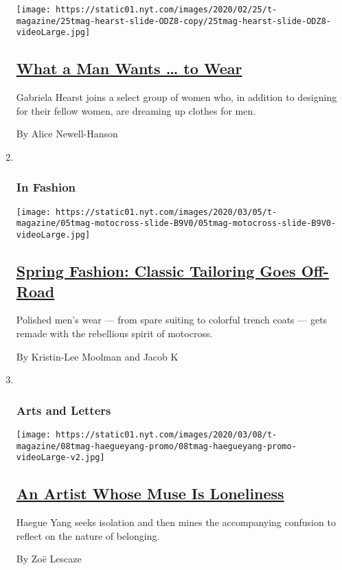 \begin{enumerate}
  \texttt{[image: https://static01.nyt.com/images/2020/02/25/t-magazine/25tmag-hearst-slide-ODZ8-copy/25tmag-hearst-slide-ODZ8-videoLarge.jpg]}

  \hypertarget{what-a-man-wants--to-wear}{%
  \subsection{\texorpdfstring{\href{/2020/02/25/t-magazine/gabriela-hearst-mens-fashion.html}{What
  a Man Wants \ldots{} to
  Wear}}{What a Man Wants \ldots{} to Wear}}\label{what-a-man-wants--to-wear}}

  Gabriela Hearst joins a select group of women who, in addition to
  designing for their fellow women, are dreaming up clothes for men.

  By Alice Newell-Hanson
\item ~
  \hypertarget{in-fashion-1}{%
  \subsubsection{In Fashion}\label{in-fashion-1}}

  \texttt{[image: https://static01.nyt.com/images/2020/03/05/t-magazine/05tmag-motocross-slide-B9V0/05tmag-motocross-slide-B9V0-videoLarge.jpg]}

  \hypertarget{spring-fashion-classic-tailoring-goes-off-road}{%
  \subsection{\texorpdfstring{\href{/2020/02/27/t-magazine/spring-mens-fashion.html}{Spring
  Fashion: Classic Tailoring Goes
  Off-Road}}{Spring Fashion: Classic Tailoring Goes Off-Road}}\label{spring-fashion-classic-tailoring-goes-off-road}}

  Polished men's wear --- from spare suiting to colorful trench coats
  --- gets remade with the rebellious spirit of motocross.

  By Kristin-Lee Moolman and Jacob K
\item ~
  \hypertarget{arts-and-letters}{%
  \subsubsection{Arts and Letters}\label{arts-and-letters}}

  \texttt{[image: https://static01.nyt.com/images/2020/03/08/t-magazine/08tmag-haegueyang-promo/08tmag-haegueyang-promo-videoLarge-v2.jpg]}

  \hypertarget{an-artist-whose-muse-is-loneliness}{%
  \subsection{\texorpdfstring{\href{/2020/02/26/t-magazine/haegue-yang.html}{An
  Artist Whose Muse Is
  Loneliness}}{An Artist Whose Muse Is Loneliness}}\label{an-artist-whose-muse-is-loneliness}}

  Haegue Yang seeks isolation and then mines the accompanying confusion
  to reflect on the nature of belonging.

  By Zoë Lescaze
\end{enumerate}

